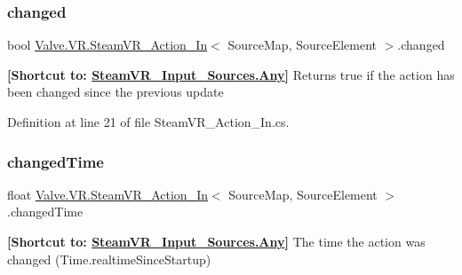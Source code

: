 \mbox{\label{class_valve_1_1_v_r_1_1_steam_v_r___action___in_a129bfbee3aa107bc4fcb46716a240d88}} 
\subsubsection{\texorpdfstring{changed}{changed}}
{\footnotesize\ttfamily bool \mbox{\hyperlink{class_valve_1_1_v_r_1_1_steam_v_r___action___in}{Valve.\+V\+R.\+Steam\+V\+R\+\_\+\+Action\+\_\+\+In}}$<$ Source\+Map, Source\+Element $>$.changed\hspace{0.3cm}{\ttfamily [get]}}



{\bfseries{\mbox{[}Shortcut to\+: \mbox{\hyperlink{namespace_valve_1_1_v_r_a82e5bf501cc3aa155444ee3f0662853faed36a1ef76a59ee3f15180e0441188ad}{Steam\+V\+R\+\_\+\+Input\+\_\+\+Sources.\+Any}}\mbox{]}}} Returns true if the action has been changed since the previous update 



Definition at line 21 of file Steam\+V\+R\+\_\+\+Action\+\_\+\+In.\+cs.

\mbox{\label{class_valve_1_1_v_r_1_1_steam_v_r___action___in_afccb197dbb5d721e390e60cce83957f4}} 
\subsubsection{\texorpdfstring{changedTime}{changedTime}}
{\footnotesize\ttfamily float \mbox{\hyperlink{class_valve_1_1_v_r_1_1_steam_v_r___action___in}{Valve.\+V\+R.\+Steam\+V\+R\+\_\+\+Action\+\_\+\+In}}$<$ Source\+Map, Source\+Element $>$.changed\+Time\hspace{0.3cm}{\ttfamily [get]}}



{\bfseries{\mbox{[}Shortcut to\+: \mbox{\hyperlink{namespace_valve_1_1_v_r_a82e5bf501cc3aa155444ee3f0662853faed36a1ef76a59ee3f15180e0441188ad}{Steam\+V\+R\+\_\+\+Input\+\_\+\+Sources.\+Any}}\mbox{]}}} The time the action was changed (Time.\+realtime\+Since\+Startup) 



